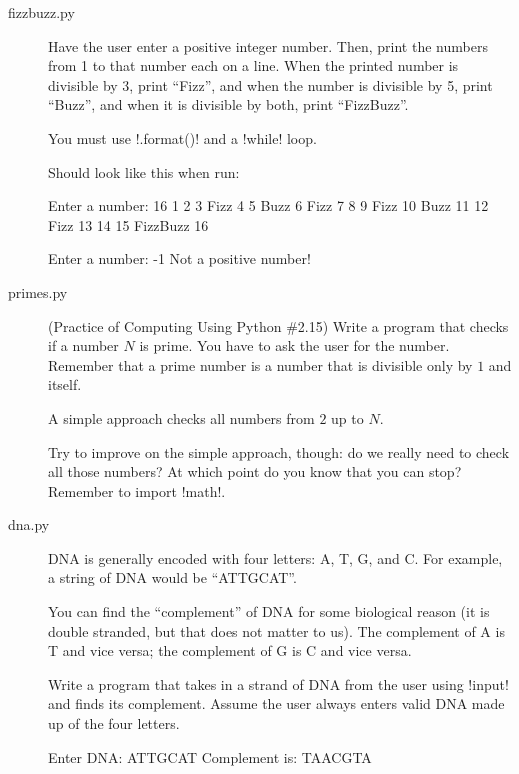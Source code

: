 \documentclass[11pt]{cselabheader}
\begin{document}
\begin{description}
  \item[fizzbuzz.py] Have the user enter a positive integer number. Then, print
    the numbers from 1 to that number each on a line. When the printed number is
    divisible by 3, print ``Fizz'', and when the number is divisible by 5, print
    ``Buzz'', and when it is divisible by both, print ``FizzBuzz''.

    You must use \pythoninline!.format()! and a \pythoninline!while! loop.

    Should look like this when run:

    \begin{verbatimcode}
Enter a number: 16
1
2
3 Fizz
4
5 Buzz
6 Fizz
7
8
9 Fizz
10 Buzz
11
12 Fizz
13
14
15 FizzBuzz
16
    \end{verbatimcode}

    \begin{verbatimcode}
Enter a number: -1
Not a positive number!
    \end{verbatimcode}


  \item[primes.py] (Practice of Computing Using Python \#2.15) Write a program
    that checks if a number $N$ is prime. You have to ask the user for the
    number. Remember that a prime
    number is a number that is divisible only by $1$ and itself.

    A simple approach checks all numbers from $2$ up to $N$.

    Try to improve on the simple approach, though: do we really need to check
    all those numbers? At which point do you know that you can stop? Remember to
    import \pythoninline!math!.

  \item[dna.py] 
    DNA is generally encoded with four letters: A, T, G, and C. For example, a
    string of DNA would be ``ATTGCAT''.

    You can find the ``complement'' of DNA for some biological reason (it is
    double stranded, but that does not matter to us). The complement of A is T
    and vice versa; the complement of G is C and vice versa.

    Write a program that takes in a strand of DNA from the user using
    \pythoninline!input! and finds its complement. Assume the user always enters
    valid DNA made up of the four letters.

    \begin{verbatimcode}
Enter DNA: ATTGCAT
Complement is: TAACGTA
    \end{verbatimcode}

\end{description}
\end{document}
